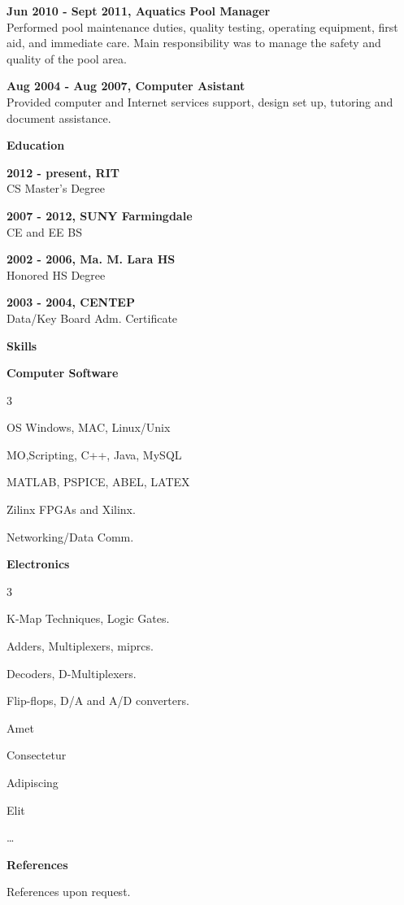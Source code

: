 \documentclass[a4paper,12pt,final]{memoir}
\newcommand{\Sep}{\vspace{1.5em}}
\newcommand{\SmallSep}{\vspace{0.5em}}
\newcommand{\CVSection}[1]
	{\Large\textbf{#1}\par
	\SmallSep\normalsize\normalfont}
\newcommand{\CVItem}[1]
	{\textbf{\color{RoyalBlue} #1}}
\begin{document}
\CVItem{Jun 2010 - Sept 2011, Aquatics Pool Manager}\\
Performed pool maintenance duties, quality testing, operating equipment, first aid, and immediate care. Main responsibility was to manage the safety and quality of the pool area.
\SmallSep

\CVItem{Aug 2004 - Aug 2007, Computer Asistant}\\
Provided computer and Internet services support, design set up, tutoring and document assistance.
\Sep

\CVSection{Education}
\CVItem{2012 - present, RIT}\\
 CS Master's Degree 
\SmallSep

\CVItem{2007 - 2012, SUNY Farmingdale}\\
 CE and EE BS
\SmallSep

\CVItem{2002 - 2006, Ma. M. Lara HS}\\
Honored HS Degree 
\SmallSep

\CVItem{2003 - 2004, CENTEP}\\
Data/Key Board Adm. Certificate
\Sep

\CVSection{Skills}
\CVItem{Computer Software}
\begin{multicols}{3}
\begin{compactitem}[\color{RoyalBlue}$\circ$]
	\item OS Windows, MAC, Linux/Unix 
	\item MO,Scripting, C++, Java, MySQL
	\item MATLAB, PSPICE, ABEL, LATEX
	\item Zilinx FPGAs and Xilinx.
	\item Networking/Data Comm.
	
\end{compactitem}
\end{multicols}
\SmallSep

\CVItem{Electronics}
\begin{multicols}{3}
\begin{compactitem}[\color{RoyalBlue}$\circ$]
	\item K-Map Techniques, Logic Gates.
	\item Adders, Multiplexers, miprcs.
	\item Decoders, D-Multiplexers.  
	\item Flip-flops, D/A and A/D converters.
	\item Amet
	\item Consectetur 
	\item Adipiscing 
	\item Elit
	\item \ldots

	
\end{compactitem}
\end{multicols}
\Sep 

\CVSection{References}
References upon request.

\end{document}
